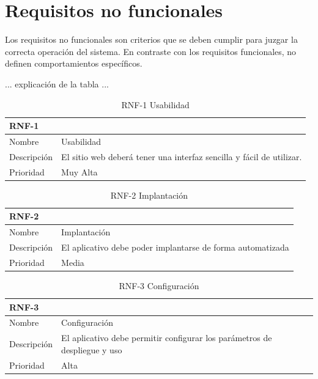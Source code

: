 \documentclass[11pt,spanish,listoffigures,listoftables]{tfgetsinf}
\begin{document}
\section{Requisitos no funcionales}

Los requisitos no funcionales son criterios que se deben cumplir para juzgar la correcta operación del sistema. En contraste con los requisitos funcionales, no definen comportamientos específicos. \par

... explicación de la tabla ... \par

\begin{table}[h]
	\centering
	\begin{tabular}{ |p{4cm}||p{10cm}|  }
		\multicolumn{2}{l}{\textbf{RNF-1}} \\
		\hline
		Nombre   & Usabilidad \\
		\hline
		Descripción  & El sitio web deberá tener una interfaz sencilla y fácil de utilizar. \\
		\hline
		Prioridad &  Muy Alta \\
		\hline
	\end{tabular}
	\caption{RNF-1 Usabilidad}
	\label{table:24}
\end{table}

\begin{table}
	\centering
	\begin{tabular}{ |p{4cm}||p{10cm}|  }
		\multicolumn{2}{l}{\textbf{RNF-2}} \\
		\hline
		Nombre   & Implantación \\
		\hline
		Descripción  & El aplicativo debe poder implantarse de forma automatizada \\
		\hline
		Prioridad &  Media \\
		\hline
	\end{tabular}
	\caption{RNF-2 Implantación}
	\label{table:25}
\end{table}

\begin{table}
	\centering
	\begin{tabular}{ |p{4cm}||p{10cm}|  }
		\multicolumn{2}{l}{\textbf{RNF-3}} \\
		\hline
		Nombre   & Configuración \\
		\hline
		Descripción  & El aplicativo debe permitir configurar los parámetros de despliegue y uso \\
		\hline
		Prioridad &  Alta \\
		\hline
	\end{tabular}
	\caption{RNF-3 Configuración}
	\label{table:26}
\end{table}
\end{document}
